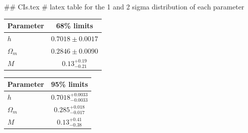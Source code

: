 ## CIs.tex
# latex table for the 1 and 2 sigma distribution of each parameter

\begin{tabular} { l  c}
 Parameter &  68\% limits\\
\hline
{\boldmath$h              $} & $0.7018\pm 0.0017          $\\
{\boldmath$\Omega_m       $} & $0.2846\pm 0.0090          $\\
{\boldmath$M              $} & $0.13^{+0.19}_{-0.21}      $\\
\hline
\end{tabular}

\begin{tabular} { l  c}
 Parameter &  95\% limits\\
\hline
{\boldmath$h              $} & $0.7018^{+0.0033}_{-0.0033}$\\
{\boldmath$\Omega_m       $} & $0.285^{+0.018}_{-0.017}   $\\
{\boldmath$M              $} & $0.13^{+0.41}_{-0.38}      $\\
\hline
\end{tabular}

